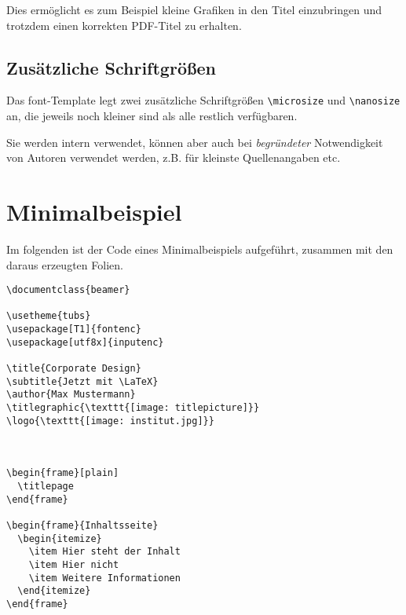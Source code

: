 Dies ermöglicht es zum Beispiel kleine Grafiken in den Titel einzubringen und
trotzdem einen korrekten PDF-Titel zu erhalten.


\subsection{Zusätzliche Schriftgrößen}

Das font-Template legt zwei zusätzliche Schriftgrößen \lstinline{\microsize}
und \lstinline{\nanosize} an, die jeweils noch kleiner sind als alle restlich
verfügbaren.

Sie werden intern verwendet, können aber auch bei \emph{begründeter}
Notwendigkeit von Autoren verwendet werden, z.B. für kleinste Quellenangaben
etc.


\section{Minimalbeispiel}%

Im folgenden ist der Code eines Minimalbeispiels aufgeführt, zusammen mit den
daraus erzeugten Folien.

\begin{verbatim}
\documentclass{beamer}

\usetheme{tubs}
\usepackage[T1]{fontenc}
\usepackage[utf8x]{inputenc}

\title{Corporate Design}
\subtitle{Jetzt mit \LaTeX}
\author{Max Mustermann}
\titlegraphic{\texttt{[image: titlepicture]}}
\logo{\texttt{[image: institut.jpg]}}



\begin{frame}[plain]
  \titlepage
\end{frame}

\begin{frame}{Inhaltsseite}
  \begin{itemize}
    \item Hier steht der Inhalt
    \item Hier nicht
    \item Weitere Informationen
  \end{itemize}
\end{frame}


\end{verbatim}

\begin{center}

\end{center}
